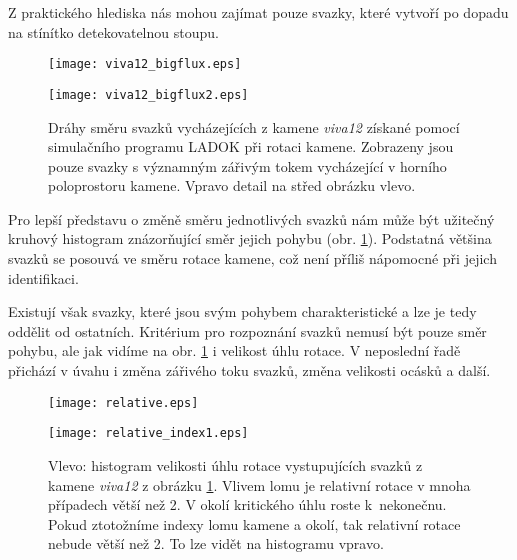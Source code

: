 Z praktického hlediska nás mohou zajímat pouze svazky, které vytvoří po dopadu na stínítko detekovatelnou stoupu.

\begin{figure}[h!]
\begin{center}
   \begin{minipage}[c]{0.48\textwidth}
     \centering \texttt{[image: viva12\_bigflux.eps]}
   \end{minipage}
   \begin{minipage}[c]{0.48\textwidth}
     \centering \texttt{[image: viva12\_bigflux2.eps]}
   \end{minipage}
 \end{center}
\caption[Dráhy pohybu svazků při rotaci kamene.]{Dráhy směru svazků vycházejících z kamene \textit{viva12} získané pomocí simulačního programu  LADOK při rotaci kamene. Zobrazeny jsou pouze svazky s významným zářivým tokem vycházející v horního poloprostoru kamene. Vpravo detail na střed obrázku vlevo.}

\label{fig:relativni pohyb graf}
\end{figure}

Pro lepší představu o změně směru jednotlivých svazků nám může být užitečný kruhový histogram znázorňující směr jejich pohybu (obr. \ref{fig:relativni pohyb graf}). Podstatná většina svazků se posouvá ve směru rotace kamene, což není příliš nápomocné při jejich identifikaci.

Existují však svazky, které jsou svým pohybem charakteristické a lze je tedy oddělit od ostatních. Kritérium pro rozpoznání svazků nemusí být pouze směr pohybu, ale jak vidíme na obr. \ref{fig:relativni pohyb graf} i velikost úhlu rotace. V neposlední řadě přichází v úvahu i změna zářivého toku svazků, změna velikosti ocásků a další. 

\begin{figure}[h!]
 \begin{center}
   \begin{minipage}[c]{0.48\textwidth}
     \centering \texttt{[image: relative.eps]} 
   \end{minipage}
   \begin{minipage}[c]{0.48\textwidth}
     \centering \texttt{[image: relative\_index1.eps]} 
   \end{minipage}
 \end{center}
\caption[Histogram velikosti rotace vystupujících svazků.]{Vlevo: histogram velikosti úhlu rotace vystupujících svazků z kamene \textit{viva12} z obrázku \ref{fig:relativni pohyb graf}. Vlivem lomu je relativní rotace v mnoha případech větší než 2. V okolí kritického úhlu roste k~nekonečnu. Pokud ztotožníme indexy lomu kamene a okolí, tak relativní rotace nebude větší než 2. To lze vidět na histogramu vpravo.}

\label{fig:histogram relativni pohyb }

\end{figure}

